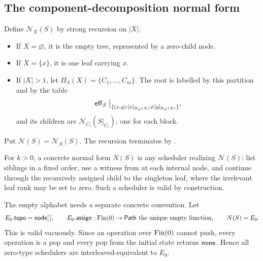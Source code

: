 \subsection{The component-decomposition normal form}

\begin{definition}
\label{def:abstract-canonical-tree}
Define \(\mathcal N_X(S)\) by strong recursion on \(|X|\).
\begin{itemize}
\item If \(X=\varnothing\), it is the empty tree, represented by a zero-child
      node.
\item If \(X=\{x\}\), it is one leaf carrying \(x\).
\item If \(|X|>1\), let
      \(\Pi_S(X)=\{C_1,\ldots,C_m\}\).  The root is labelled by this
      partition and by the table
      \begin{equation}
        \mathsf{eff}_S\bigm|_{
          \{(x,y):[x]_{\Pi_S(X)}\ne[y]_{\Pi_S(X)}\}},
        \label{eq:canonical-node-label}
      \end{equation}
      and its children are
      \(\mathcal N_{C_i}(S|_{C_i})\), one for each block.
\end{itemize}
Put \(\mathcal N(S)=\mathcal N_A(S)\).  The recursion terminates by
.
\end{definition}

For \(k>0\), a concrete normal form \(N(S)\) is any scheduler realizing
\(\mathcal N(S)\): list siblings in a fixed order, use a witness from
 at each internal node, and continue
through the recursively assigned child to the singleton leaf, where the
irrelevant leaf rank may be set to zero.  Such a scheduler is valid by
construction.

The empty alphabet needs a separate concrete convention.  Let
\begin{equation}
  E_0.\mathsf{topo}=\mathsf{node}[\,],
  \qquad
  E_0.\mathsf{assign}:\operatorname{Fin}(0)\to\mathsf{Path}
  \text{ the unique empty function},
  \qquad N(S)=E_0.
  \label{eq:empty-canonical-scheduler}
\end{equation}
This is valid vacuously.  Since an operation over \(\operatorname{Fin}(0)\) cannot push,
every operation is a pop and every pop from the initial state returns
\(\mathsf{none}\).  Hence all zero-type schedulers are interleaved-equivalent to
\(E_0\).

